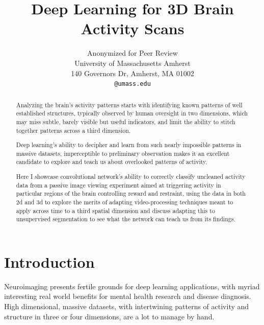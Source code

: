 \documentclass[10pt,twocolumn,letterpaper]{article}
\begin{document}
\title{Deep Learning for 3D Brain Activity Scans}

\author{Anonymized for Peer Review\\
University of Massachusetts Amherst\\
140 Governors Dr, Amherst, MA 01002\\
{\tt\small @umass.edu}
}

\maketitle

\begin{abstract}
 Analyzing the brain's activity patterns starts with identifying known patterns of well established structures,
 typically observed by human oversight in two dimensions, which may miss subtle, barely visible but useful indicators,
 and limit the ability to stitch together patterns across a third dimension.

 Deep learning's ability to decipher and learn from such nearly impossible patterns in massive datasets,
 imperceptible to preliminary observation makes it an excellent candidate to explore and teach us about
 overlooked patterns of activity.

 Here I showcase convolutional network's ability to correctly classify uncleaned activity data from a passive
 image viewing experiment aimed at triggering activity in particular regions of the brain controlling reward and
 restraint, using the data in both 2d and 3d to explore the merits of adapting video-processing techniques meant
 to apply across time to a third spatial dimension and discuss adapting this to unsupervised segmentation to see
 what the network can teach us from its findings.

\end{abstract}

\section{Introduction}\label{sec:introduction}
Neuroimaging presents fertile grounds for deep learning applications, with myriad interesting real world benefits
for mental health research and disease diagnosis.
High dimensional, massive datasets, with intertwining patterns of activity and structure in three or four
dimensions, are a lot to manage by hand.
\end{document}
